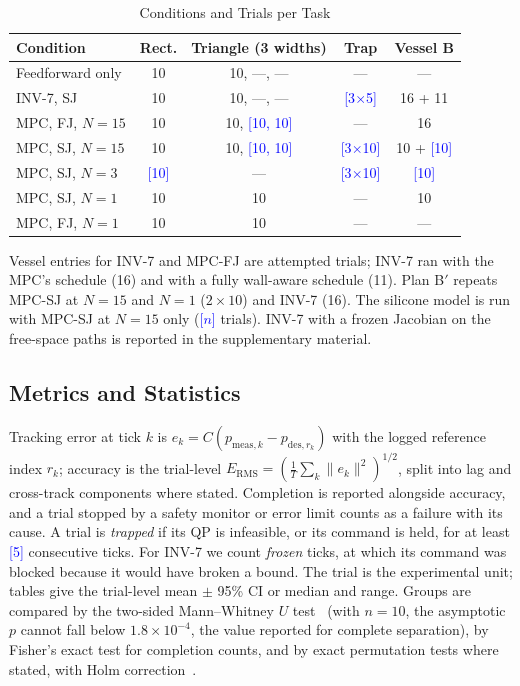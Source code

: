 \documentclass[journal]{IEEEtran}
\newcommand{\NEWRUN}[1]{\textcolor{blue}{[#1]}}
\begin{document}
\begin{table}[t]
\centering
\caption{Conditions and Trials per Task}
\label{tab:conditions}
\footnotesize
\setlength{\tabcolsep}{2.5pt}
\begin{tabular}{@{}lcccc@{}}
\toprule
Condition & Rect. & Triangle (3 widths) & Trap & Vessel B \\
\midrule
Feedforward only & 10 & 10, ---, --- & --- & --- \\
INV-7, SJ        & 10 & 10, ---, --- & \NEWRUN{3$\times$5} & 16 + 11 \\
MPC, FJ, $N=15$  & 10 & 10, \NEWRUN{10, 10} & --- & 16 \\
MPC, SJ, $N=15$  & 10 & 10, \NEWRUN{10, 10} & \NEWRUN{3$\times$10} & 10 + \NEWRUN{10} \\
MPC, SJ, $N=3$   & \NEWRUN{10} & --- & \NEWRUN{3$\times$10} & \NEWRUN{10} \\
MPC, SJ, $N=1$   & 10 & 10 & --- & 10 \\
MPC, FJ, $N=1$   & 10 & 10 & --- & --- \\
\bottomrule
\end{tabular}

\vspace{2pt}
\parbox{\columnwidth}{\footnotesize Vessel entries for INV-7 and MPC-FJ
are attempted trials; INV-7 ran with the MPC's schedule (16) and with a
fully wall-aware schedule (11). Plan B$'$ repeats MPC-SJ at $N=15$ and
$N=1$ ($2\times10$) and INV-7 (16). The silicone model is run with MPC-SJ
at $N=15$ only (\NEWRUN{$n$} trials). INV-7 with a frozen Jacobian on the
free-space paths is reported in the supplementary material.}
\end{table}

\subsection{Metrics and Statistics}
\label{sec:metrics}

Tracking error at tick $k$ is $e_k=C(p_{\mathrm{meas},k}-p_{\mathrm{des},r_k})$
with the logged reference index $r_k$; accuracy is the trial-level
$E_{\mathrm{RMS}}=(\frac1T\sum_k\lVert e_k\rVert^2)^{1/2}$, split into lag
and cross-track components where stated. Completion is reported alongside
accuracy, and a trial stopped by a safety monitor or error limit counts as
a failure with its cause. A trial is \emph{trapped} if its QP is
infeasible, or its command is held, for at least \NEWRUN{5} consecutive
ticks. For INV-7 we count \emph{frozen} ticks, at which its command was
blocked because it would have broken a bound. The trial is the
experimental unit; tables give the trial-level mean $\pm$ 95\% CI or
median and range. Groups are compared by the two-sided Mann--Whitney $U$
test~\cite{mann1947test} (with $n=10$, the asymptotic $p$ cannot fall
below $1.8\times10^{-4}$, the value reported for complete separation), by
Fisher's exact test for completion counts, and by exact permutation tests
where stated, with Holm correction~\cite{holm1979simple}.
\end{document}
